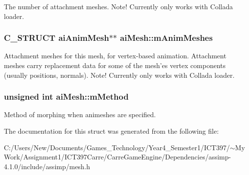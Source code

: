 The number of attachment meshes. Note! Currently only works with Collada loader. \hypertarget{structai_mesh_5078f7db7e99ed05db89dfa412f0e990}{
\subsubsection[mAnimMeshes]{\setlength{\rightskip}{0pt plus 5cm}C\_\-STRUCT {\bf aiAnimMesh}$\ast$$\ast$ {\bf aiMesh::mAnimMeshes}}}
\label{structai_mesh_5078f7db7e99ed05db89dfa412f0e990}


Attachment meshes for this mesh, for vertex-based animation. Attachment meshes carry replacement data for some of the mesh'es vertex components (usually positions, normals). Note! Currently only works with Collada loader. \hypertarget{structai_mesh_3a6c8c5f1d6543bfdd930f6b07467665}{
\subsubsection[mMethod]{\setlength{\rightskip}{0pt plus 5cm}unsigned int {\bf aiMesh::mMethod}}}
\label{structai_mesh_3a6c8c5f1d6543bfdd930f6b07467665}


Method of morphing when animeshes are specified. 

The documentation for this struct was generated from the following file:\begin{CompactItemize}
\item 
C:/Users/New/Documents/Games\_\-Technology/Year4\_\-Semester1/ICT397/$\sim$My Work/Assignment1/ICT397Carre/CarreGameEngine/Dependencies/assimp-4.1.0/include/assimp/mesh.h\end{CompactItemize}
